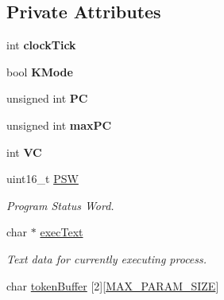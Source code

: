 \subsection*{\-Private \-Attributes}
\begin{DoxyCompactItemize}
\item 
\hypertarget{classcCPU_a11a80a1e97141537b44499364c67c8a4}{int {\bfseries clock\-Tick}}\label{d2/dc6/classcCPU_a11a80a1e97141537b44499364c67c8a4}

\item 
\hypertarget{classcCPU_af1d6fd5349bde1621595f6c1422792b4}{bool {\bfseries \-K\-Mode}}\label{d2/dc6/classcCPU_af1d6fd5349bde1621595f6c1422792b4}

\item 
\hypertarget{classcCPU_a982f4af913ec39928e62129200c21e58}{unsigned int {\bfseries \-P\-C}}\label{d2/dc6/classcCPU_a982f4af913ec39928e62129200c21e58}

\item 
\hypertarget{classcCPU_af6d922807d65a8a39722dde518febc52}{unsigned int {\bfseries max\-P\-C}}\label{d2/dc6/classcCPU_af6d922807d65a8a39722dde518febc52}

\item 
\hypertarget{classcCPU_aae9fc88ce939489754ac776b6447607b}{int {\bfseries \-V\-C}}\label{d2/dc6/classcCPU_aae9fc88ce939489754ac776b6447607b}

\item 
\hypertarget{classcCPU_a52457b3189761c2f07c9fb12169dad50}{uint16\-\_\-t \hyperlink{classcCPU_a52457b3189761c2f07c9fb12169dad50}{\-P\-S\-W}}\label{d2/dc6/classcCPU_a52457b3189761c2f07c9fb12169dad50}

\begin{DoxyCompactList}\small\item\em \-Program \-Status \-Word. \end{DoxyCompactList}\item 
\hypertarget{classcCPU_ad50800fe39f7f8d51dc7095e441db94a}{char $\ast$ \hyperlink{classcCPU_ad50800fe39f7f8d51dc7095e441db94a}{exec\-Text}}\label{d2/dc6/classcCPU_ad50800fe39f7f8d51dc7095e441db94a}

\begin{DoxyCompactList}\small\item\em \-Text data for currently executing process. \end{DoxyCompactList}\item 
\hypertarget{classcCPU_a06d3e3497a2636740db81fa00641fd88}{char \hyperlink{classcCPU_a06d3e3497a2636740db81fa00641fd88}{token\-Buffer} \mbox{[}2\mbox{]}\mbox{[}\hyperlink{cpu_8h_a9e34e5196b1f8e4c96f229d062c73fe0}{\-M\-A\-X\-\_\-\-P\-A\-R\-A\-M\-\_\-\-S\-I\-Z\-E}\mbox{]}}\label{d2/dc6/classcCPU_a06d3e3497a2636740db81fa00641fd88}


\end{DoxyCompactItemize}
